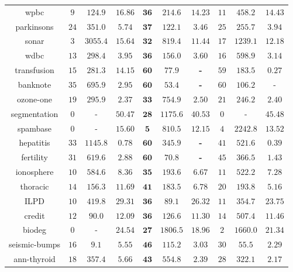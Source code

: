 \begin{tabular}{cccccccccc}
wpbc & $9$ & $124.9$ & $16.86$ & $\mathbf{36}$ & $\mathbf{214.6}$ & $\mathbf{14.23}$ & $11$ & $458.2$ & $14.43$\\
parkinsons & $24$ & $351.0$ & $5.74$ & $\mathbf{37}$ & $\mathbf{122.1}$ & $\mathbf{3.46}$ & $25$ & $255.7$ & $3.94$\\
sonar & $3$ & $3055.4$ & $15.64$ & $\mathbf{32}$ & $\mathbf{819.4}$ & $\mathbf{11.44}$ & $17$ & $1239.1$ & $12.18$\\
wdbc & $13$ & $298.4$ & $3.95$ & $\mathbf{36}$ & $\mathbf{156.0}$ & $\mathbf{3.60}$ & $16$ & $598.9$ & $3.14$\\
transfusion & $15$ & $281.3$ & $14.15$ & $\mathbf{60}$ & $\mathbf{77.9}$ & \textbf{-} & $59$ & $183.5$ & $0.27$\\
banknote & $35$ & $695.9$ & $2.95$ & $\mathbf{60}$ & $\mathbf{53.4}$ & \textbf{-} & $60$ & $106.2$ & -\\
ozone-one & $19$ & $295.9$ & $2.37$ & $\mathbf{33}$ & $\mathbf{754.9}$ & $\mathbf{2.50}$ & $21$ & $246.2$ & $2.40$\\
segmentation & $0$ & - & $50.47$ & $\mathbf{28}$ & $\mathbf{1175.6}$ & $\mathbf{40.53}$ & $0$ & - & $45.48$\\
spambase & $0$ & - & $15.60$ & $\mathbf{5}$ & $\mathbf{810.5}$ & $\mathbf{12.15}$ & $4$ & $2242.8$ & $13.52$\\
\hline
hepatitis & $33$ & $1145.8$ & $0.78$ & $\mathbf{60}$ & $\mathbf{345.9}$ & \textbf{-} & $41$ & $521.6$ & $0.39$\\
fertility & $31$ & $619.6$ & $2.88$ & $\mathbf{60}$ & $\mathbf{70.8}$ & \textbf{-} & $45$ & $366.5$ & $1.43$\\
ionosphere & $10$ & $584.6$ & $8.36$ & $\mathbf{35}$ & $\mathbf{193.6}$ & $\mathbf{6.67}$ & $11$ & $522.2$ & $7.28$\\
thoracic & $14$ & $156.3$ & $11.69$ & $\mathbf{41}$ & $\mathbf{183.5}$ & $\mathbf{6.78}$ & $20$ & $193.8$ & $5.16$\\
ILPD & $10$ & $419.8$ & $29.31$ & $\mathbf{36}$ & $\mathbf{89.1}$ & $\mathbf{26.32}$ & $11$ & $354.7$ & $23.75$\\
credit & $12$ & $90.0$ & $12.09$ & $\mathbf{36}$ & $\mathbf{126.6}$ & $\mathbf{11.30}$ & $14$ & $507.4$ & $11.46$\\
biodeg & $0$ & - & $24.54$ & $\mathbf{27}$ & $\mathbf{1806.5}$ & $\mathbf{18.96}$ & $2$ & $1660.0$ & $21.34$\\
seismic-bumps & $16$ & $9.1$ & $5.55$ & $\mathbf{46}$ & $\mathbf{115.2}$ & $\mathbf{3.03}$ & $30$ & $55.5$ & $2.29$\\
ann-thyroid & $18$ & $357.4$ & $5.66$ & $\mathbf{43}$ & $\mathbf{554.8}$ & $\mathbf{2.39}$ & $28$ & $322.1$ & $2.17$\\
\hline
\end{tabular}